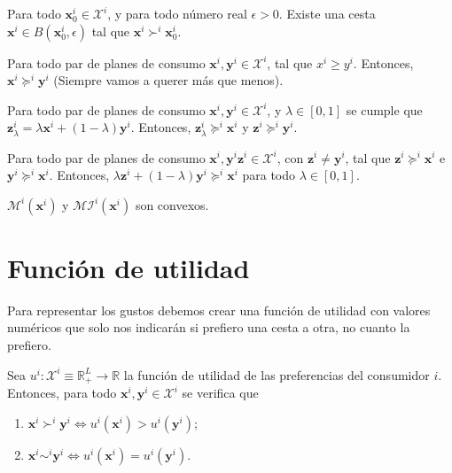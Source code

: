 \begin{axioma}
    Para todo $\textbf{x}_0^i\in \mathcal{X}^i$, y para todo número real $\epsilon>0$. Existe una cesta $\textbf{x}^i\in B\left(\textbf{x}^i_0,\epsilon\right)$ tal que $\textbf{x}^i\succ^i \textbf{x}^i_0$.
\end{axioma}

\begin{axioma}[Monotonicidad]
    Para todo par de planes de consumo $\textbf{x}^i,\textbf{y}^i\in \mathcal{X}^i$, tal que $x^i\geq y^i$. Entonces, $\textbf{x}^i\succeq^i \textbf{y}^i$ (Siempre vamos a querer más que menos).
\end{axioma}

\begin{axioma}[Convexidad]
    Para todo par de planes de consumo $\textbf{x}^i,\textbf{y}^i\in \mathcal{X}^i$, y $\lambda\in [0,1]$ se cumple que $\textbf{z}^i_\lambda = \lambda\textbf{x}^i+(1-\lambda)\textbf{y}^i$. Entonces, $\textbf{z}_\lambda^i\succeq^i \textbf{x}^i$ y $\textbf{z}^i \succeq^i \textbf{y}^i$. 
\end{axioma}

\begin{axioma}
    Para todo par de planes de consumo $\textbf{x}^i,\textbf{y}^i \textbf{z}^i \in \mathcal{X}^i$, con $\textbf{z}^i\neq \textbf{y}^i$, tal que $\textbf{z}^i\succeq^i \textbf{x}^i$ e $\textbf{y}^i \succeq^i \textbf{x}^i$. Entonces,  $\lambda\textbf{z}^i+(1-\lambda)\textbf{y}^i \succeq^i \textbf{x}^i$ para todo $\lambda\in [0,1]$.
\end{axioma}

$\mathcal{M}^i\left(\textbf{x}^i\right)$ y $\mathcal{MI}^i\left(\textbf{x}^i\right)$ son convexos.


\section{Función de utilidad}
Para representar los gustos debemos crear una función de utilidad con valores numéricos que solo nos indicarán si prefiero una cesta a otra, no cuanto la prefiero.

Sea $u^i:\mathcal{X}^i \equiv \mathbb{R}^L_+ \to \mathbb{R}$ la función de utilidad de las preferencias del consumidor $i$. Entonces, para todo $\textbf{x}^i,\textbf{y}^i\in \mathcal{X}^i$ se verifica que 
\begin{enumerate}[\bfseries i)]
    \item $\textbf{x}^i\succ^i\textbf{y}^i \iff u^i\left(\textbf{x}^i\right)>u^i\left(\textbf{y}^i\right)$;
    \item $\textbf{x}^i\sim^i\textbf{y}^i \iff u^i\left(\textbf{x}^i\right)=u^i\left(\textbf{y}^i\right)$.
 \end{enumerate}


